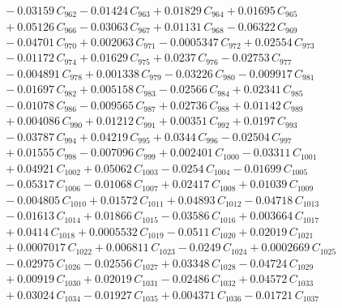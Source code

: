\documentclass[a4paper,11pt]{article}
\begin{document}
\begin{align}
&\quad - 0.03159\,C_{962} - 0.01424\,C_{963} + 0.01829\,C_{964} + 0.01695\,C_{965} \nonumber\\
&\quad + 0.05126\,C_{966} - 0.03063\,C_{967} + 0.01131\,C_{968} - 0.06322\,C_{969} \nonumber\\
&\quad - 0.04701\,C_{970} + 0.002063\,C_{971} - 0.0005347\,C_{972} + 0.02554\,C_{973} \nonumber\\
&\quad - 0.01172\,C_{974} + 0.01629\,C_{975} + 0.0237\,C_{976} - 0.02753\,C_{977} \nonumber\\
&\quad - 0.004891\,C_{978} + 0.001338\,C_{979} - 0.03226\,C_{980} - 0.009917\,C_{981} \nonumber\\
&\quad - 0.01697\,C_{982} + 0.005158\,C_{983} - 0.02566\,C_{984} + 0.02341\,C_{985} \nonumber\\
&\quad - 0.01078\,C_{986} - 0.009565\,C_{987} + 0.02736\,C_{988} + 0.01142\,C_{989} \nonumber\\
&\quad + 0.004086\,C_{990} + 0.01212\,C_{991} + 0.00351\,C_{992} + 0.0197\,C_{993} \nonumber\\
&\quad - 0.03787\,C_{994} + 0.04219\,C_{995} + 0.0344\,C_{996} - 0.02504\,C_{997} \nonumber\\
&\quad + 0.01555\,C_{998} - 0.007096\,C_{999} + 0.002401\,C_{1000} - 0.03311\,C_{1001} \nonumber\\
&\quad + 0.04921\,C_{1002} + 0.05062\,C_{1003} - 0.0254\,C_{1004} - 0.01699\,C_{1005} \nonumber\\
&\quad - 0.05317\,C_{1006} - 0.01068\,C_{1007} + 0.02417\,C_{1008} + 0.01039\,C_{1009} \nonumber\\
&\quad - 0.004805\,C_{1010} + 0.01572\,C_{1011} + 0.04893\,C_{1012} - 0.04718\,C_{1013} \nonumber\\
&\quad - 0.01613\,C_{1014} + 0.01866\,C_{1015} - 0.03586\,C_{1016} + 0.003664\,C_{1017} \nonumber\\
&\quad + 0.0414\,C_{1018} + 0.0005532\,C_{1019} - 0.0511\,C_{1020} + 0.02019\,C_{1021} \nonumber\\
&\quad + 0.0007017\,C_{1022} + 0.006811\,C_{1023} - 0.0249\,C_{1024} + 0.0002669\,C_{1025} \nonumber\\
&\quad - 0.02975\,C_{1026} - 0.02556\,C_{1027} + 0.03348\,C_{1028} - 0.04724\,C_{1029} \nonumber\\
&\quad + 0.00919\,C_{1030} + 0.02019\,C_{1031} - 0.02486\,C_{1032} + 0.04572\,C_{1033} \nonumber\\
&\quad + 0.03024\,C_{1034} - 0.01927\,C_{1035} + 0.004371\,C_{1036} - 0.01721\,C_{1037} \nonumber\\

\end{align}
\end{document}
